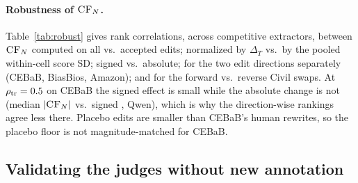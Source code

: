 \begin{table}[t]
\centering\small\setlength{\tabcolsep}{4pt}
\resizebox{0.85\textwidth}{!}{}
\caption{LLM-judge verdicts per edit kind. Qwen judge: Qwen3-32B (Amazon: Qwen3.8-27B). Amazon: $N$ changed is the word-list check, and acceptance also requires an unchanged strength of opinion.}
\label{tab:judges}
\end{table}


\paragraph{Robustness of $\cfn$.} Table~\ref{tab:robust} gives rank correlations, across competitive extractors, between $\cfn$ computed on all vs.\ accepted edits; normalized by $\Delta_T$ vs.\ by the pooled within-cell score SD; signed vs.\ absolute; for the two edit directions separately (CEBaB, BiasBios, Amazon); and for the forward vs.\ reverse Civil swaps. At $\rho_{\text{tr}}=0.5$ on CEBaB the signed effect is small while the absolute change is not (median $|\textsc{CF}_{N}|$ \absCFcebabQFive{} vs.\ signed \sgnCFcebabQFive{}, Qwen), which is why the direction-wise rankings agree less there. Placebo edits are smaller than CEBaB's human rewrites, so the placebo floor is not magnitude-matched for CEBaB.

\begin{table}[h]
\centering\small\setlength{\tabcolsep}{2pt}
\resizebox{\columnwidth}{!}{}
\caption{Rank correlations between variants of $\cfn$ across competitive extractors (medians of 3 training samples).}
\label{tab:robust}
\end{table}

\subsection{Validating the judges without new annotation}\label{app:judgeval}
